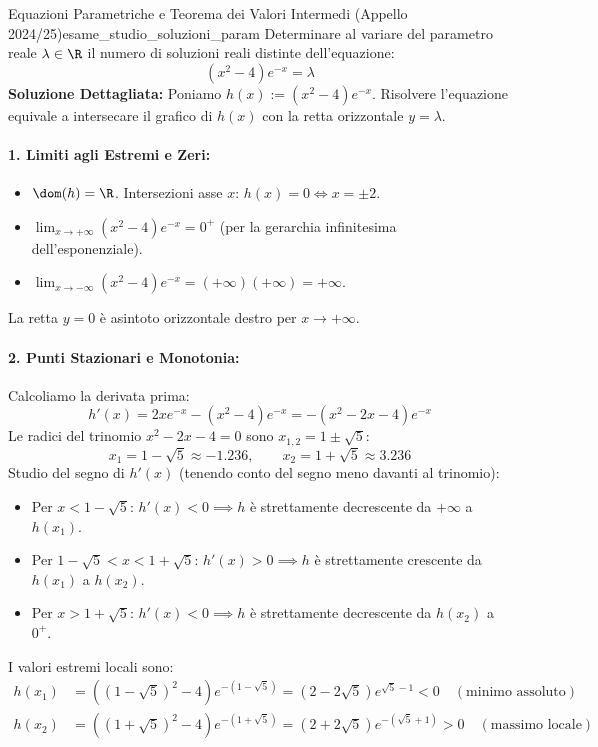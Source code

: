 \begin{esempio}{Equazioni Parametriche e Teorema dei Valori Intermedi (Appello 2024/25)}{esame_studio_soluzioni_param}
Determinare al variare del parametro reale $\lambda \in \R$ il numero di soluzioni reali distinte dell'equazione:
\[
    (x^2 - 4)e^{-x} = \lambda
\]
\tcblower
\textbf{Soluzione Dettagliata:}
Poniamo $h(x) := (x^2 - 4)e^{-x}$. Risolvere l'equazione equivale a intersecare il grafico di $h(x)$ con la retta orizzontale $y = \lambda$.

\paragraph{1. Limiti agli Estremi e Zeri:}
\begin{itemize}
    \item $\dom(h) = \R$. Intersezioni asse $x$: $h(x) = 0 \iff x = \pm 2$.
    \item $\lim_{x \to +\infty} (x^2 - 4)e^{-x} = 0^+$ (per la gerarchia infinitesima dell'esponenziale).
    \item $\lim_{x \to -\infty} (x^2 - 4)e^{-x} = (+\infty)(+\infty) = +\infty$.
\end{itemize}
La retta $y = 0$ è asintoto orizzontale destro per $x \to +\infty$.

\paragraph{2. Punti Stazionari e Monotonia:}
Calcoliamo la derivata prima:
\[
    h'(x) = 2x e^{-x} - (x^2 - 4)e^{-x} = -(x^2 - 2x - 4)e^{-x}
\]
Le radici del trinomio $x^2 - 2x - 4 = 0$ sono $x_{1,2} = 1 \pm \sqrt{5}$:
\[
    x_1 = 1 - \sqrt{5} \approx -1.236, \qquad x_2 = 1 + \sqrt{5} \approx 3.236
\]
Studio del segno di $h'(x)$ (tenendo conto del segno meno davanti al trinomio):
\begin{itemize}
    \item Per $x < 1 - \sqrt{5}$: $h'(x) < 0 \implies h$ è strettamente decrescente da $+\infty$ a $h(x_1)$.
    \item Per $1 - \sqrt{5} < x < 1 + \sqrt{5}$: $h'(x) > 0 \implies h$ è strettamente crescente da $h(x_1)$ a $h(x_2)$.
    \item Per $x > 1 + \sqrt{5}$: $h'(x) < 0 \implies h$ è strettamente decrescente da $h(x_2)$ a $0^+$.
\end{itemize}
I valori estremi locali sono:
\begin{align*}
    h(x_1) &= \left((1-\sqrt{5})^2 - 4\right)e^{-(1-\sqrt{5})} = (2 - 2\sqrt{5})e^{\sqrt{5}-1} < 0 \quad (\text{minimo assoluto}) \\
    h(x_2) &= \left((1+\sqrt{5})^2 - 4\right)e^{-(1+\sqrt{5})} = (2 + 2\sqrt{5})e^{-(\sqrt{5}+1)} > 0 \quad (\text{massimo locale})
\end{align*}


\end{esempio}
